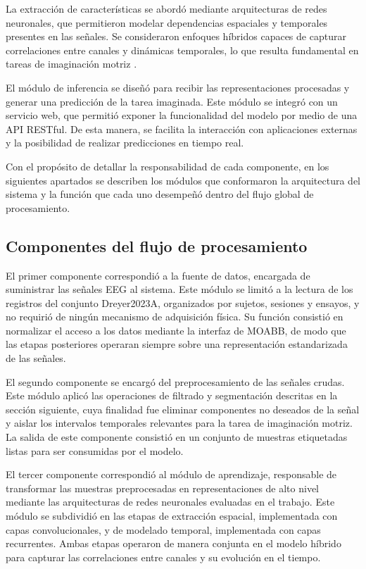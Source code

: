 La extracción de características se abordó mediante arquitecturas de redes neuronales, que permitieron modelar dependencias espaciales y temporales presentes en las señales. Se consideraron enfoques híbridos capaces de capturar correlaciones entre canales y dinámicas temporales, lo que resulta fundamental en tareas de imaginación motriz \cite{zhang2021eeg}.

El módulo de inferencia se diseñó para recibir las representaciones procesadas y generar una predicción de la tarea imaginada. Este módulo se integró con un servicio web, que permitió exponer la funcionalidad del modelo por medio de una API RESTful. De esta manera, se facilita la interacción con aplicaciones externas y la posibilidad de realizar predicciones en tiempo real.

Con el propósito de detallar la responsabilidad de cada componente, en los siguientes apartados se describen los módulos que conformaron la arquitectura del sistema y la función que cada uno desempeñó dentro del flujo global de procesamiento.

\subsection{Componentes del flujo de procesamiento}

El primer componente correspondió a la fuente de datos, encargada de suministrar las señales EEG al sistema. Este módulo se limitó a la lectura de los registros del conjunto Dreyer2023A, organizados por sujetos, sesiones y ensayos, y no requirió de ningún mecanismo de adquisición física. Su función consistió en normalizar el acceso a los datos mediante la interfaz de MOABB, de modo que las etapas posteriores operaran siempre sobre una representación estandarizada de las señales.

El segundo componente se encargó del preprocesamiento de las señales crudas. Este módulo aplicó las operaciones de filtrado y segmentación descritas en la sección siguiente, cuya finalidad fue eliminar componentes no deseados de la señal y aislar los intervalos temporales relevantes para la tarea de imaginación motriz. La salida de este componente consistió en un conjunto de muestras etiquetadas listas para ser consumidas por el modelo.

El tercer componente correspondió al módulo de aprendizaje, responsable de transformar las muestras preprocesadas en representaciones de alto nivel mediante las arquitecturas de redes neuronales evaluadas en el trabajo. Este módulo se subdividió en las etapas de extracción espacial, implementada con capas convolucionales, y de modelado temporal, implementada con capas recurrentes. Ambas etapas operaron de manera conjunta en el modelo híbrido para capturar las correlaciones entre canales y su evolución en el tiempo.

